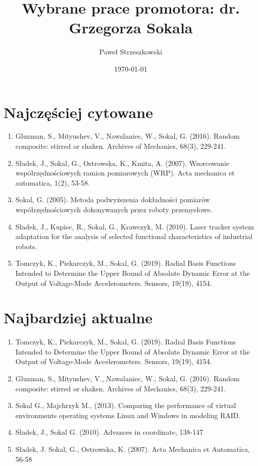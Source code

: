 \documentclass{article}
\title{Wybrane prace promotora: dr. Grzegorza Sokala}
\author{Paweł Strzeszkowski}
\date{\today}
\begin{document}
\maketitle

\section{Najczęściej cytowane}

\begin{enumerate}
    \item Gluzman, S., Mityushev, V., Nawalaniec, W., Sokal, G. (2016). Random composite: stirred or shaken. Archives of Mechanics, 68(3), 229-241.
    \item Sładek, J., Sokal, G., Ostrowska, K., Kmita, A. (2007). Wzorcowanie współrzędnościowych ramion pomiarowych (WRP). Acta mechanica et automatica, 1(2), 53-58.
    \item Sokal, G. (2005). Metoda podwyższenia dokładności pomiarów współrzędnościowych dokonywanych przez roboty przemysłowe.
    \item Sładek, J., Kupiec, R., Sokal, G., Krawczyk, M. (2010). Laser tracker system adaptation for the analysis of selected functional characteristics of industrial robots.
    \item Tomczyk, K., Piekarczyk, M., Sokal, G. (2019). Radial Basis Functions Intended to Determine the Upper Bound of Absolute Dynamic Error at the Output of Voltage-Mode Accelerometers. Sensors, 19(19), 4154.
\end{enumerate}

\section{Najbardziej aktualne}

\begin{enumerate}
    \item Tomczyk, K., Piekarczyk, M., Sokal, G. (2019). Radial Basis Functions Intended to Determine the Upper Bound of Absolute Dynamic Error at the Output of Voltage-Mode Accelerometers. Sensors, 19(19), 4154.
    \item Gluzman, S., Mityushev, V., Nawalaniec, W., Sokal, G. (2016). Random composite: stirred or shaken. Archives of Mechanics, 68(3), 229-241.
    \item Sokal G., Majchrzyk M., (2013). Comparing the performance of virtual environments operating systems Linux and Windows in modeling RAID.
    \item Sładek, J., Sokal G. (2010). Advances in coordinate, 138-147
    \item Sładek, J. Sokal, G., Ostrowska, K. (2007). Acta Mechanica et Automatica, 56-58
\end{enumerate}
\end{document}
